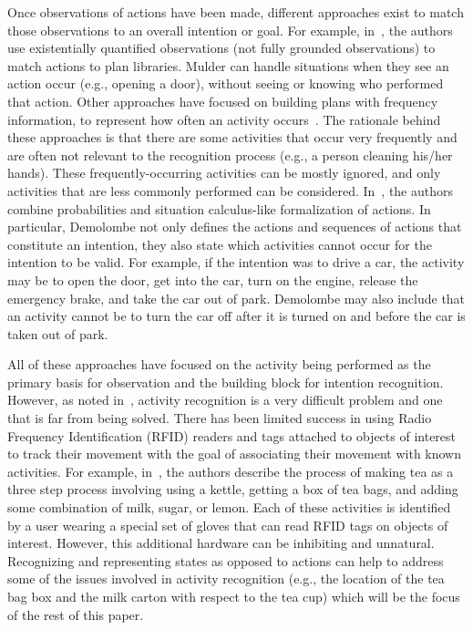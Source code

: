 \documentclass[preprint,12pt]{elsarticle}
\begin{document}
Once observations of actions have been made, different approaches exist to match those observations to an overall intention or goal. For example, in~\cite{MULDER.IF.2003}, the authors use existentially quantified observations (not fully grounded observations) to match actions to plan libraries. Mulder can handle situations when they see an action occur (e.g., opening a door), without seeing or knowing who performed that action. Other approaches have focused on building plans with frequency information, to represent how often an activity occurs~\cite{JARVIS.AIM.2005}. The rationale behind these approaches is that there are some activities that occur very frequently and are often not relevant to the recognition process (e.g., a person cleaning his/her hands). These frequently-occurring activities can be mostly ignored, and only activities that are less commonly performed can be considered. In~\cite{DEMOLOMBE.CLIMA.2005}, the authors combine probabilities and situation calculus-like formalization of actions. In particular, Demolombe not only defines the actions and sequences of actions that constitute an intention, they also state which activities cannot occur for the intention to be valid. For example, if the intention was to drive a car, the activity may be to open the door, get into the car, turn on the engine, release the emergency brake, and take the car out of park. Demolombe may also include that an activity cannot be to turn the car off after it is turned on and before the car is taken out of park.

All of these approaches have focused on the activity being performed as the primary basis for observation and the building block for intention recognition. However, as noted in~\cite{SADRI.2011}, activity recognition is a very difficult problem and one that is far from being solved. There has been limited success in using Radio Frequency Identification (RFID) readers and tags attached to objects of interest to track their movement with the goal of associating their movement with known activities. For example, in~\cite{Philipose.PC.2004}, the authors describe the process of making tea as a three step process involving using a kettle, getting a box of tea bags, and adding some combination of milk, sugar, or lemon. Each of these activities is identified by a user wearing a special set of gloves that can read RFID tags on objects of interest. However, this additional hardware can be inhibiting and unnatural.  Recognizing and representing states as opposed to actions can help to address some of the issues involved in activity recognition (e.g., the location of the tea bag box and the milk carton with respect to the tea cup) which will be the focus of the rest of this paper.
\end{document}
